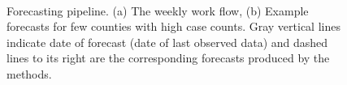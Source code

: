 \documentclass[sigconf]{acmart}
\begin{document}
\begin{figure}[t!]
    \centering
    \\
    \caption{Forecasting pipeline. (a) The weekly work flow, (b) Example forecasts for few counties with high case counts. Gray vertical lines indicate date of forecast (date of last observed data) and dashed lines to its right are the corresponding forecasts produced by the methods.}
    \label{fig:flowchart}
\end{figure}
\end{document}
